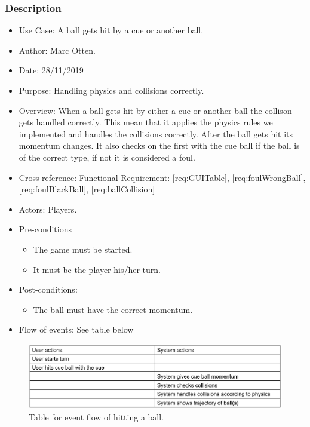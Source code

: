 \documentclass[10pt]{article}
\begin{document}
		\subsubsection{Description}
		\begin{itemize}
			\item{Use Case:} A ball gets hit by a cue or another ball.
			\item{Author:} Marc Otten.
			\item{Date:} 28/11/2019
			\item{Purpose:} Handling physics and collisions correctly.
			\item{Overview:} When a ball gets hit by either a cue or another ball the collison gets handled correctly. This mean that it applies the physics rules we implemented and handles the collisions correctly. After the ball gets hit its momentum changes. It also checks on the first with the cue ball if the ball is of the correct type, if not it is considered a foul.
			\item{Cross-reference:} Functional Requirement: \ref{req:GUITable}, \ref{req:foulWrongBall}, \ref{req:foulBlackBall}, \ref{req:ballCollision}
			\item{Actors:} Players.
			\item{Pre-conditions} 
				\begin{itemize}
					\item The game must be started.
					\item It must be the player his/her turn.
				\end{itemize}
			\item{Post-conditions:}
				\begin{itemize}
					\item The ball must have the correct momentum.
				\end{itemize}
				\item{Flow of events:} See table below
			\end{itemize}
		\begin{figure}[H]
			\includegraphics[width=\linewidth]{latex_images/HittingBallTable.png}
			\caption{Table for event flow of hitting a ball.}
		\end{figure}
\end{document}
